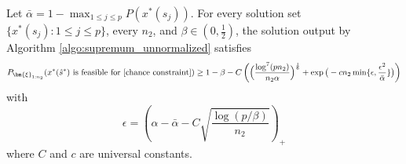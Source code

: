 \documentclass[mnsc,blindrev]{informs4} %
\newcommand{\prth}[1]{\left(#1\right)}
\begin{document}





\begin{theorem}\label{feasibility:gs unnormalized}
Let $\bar{\alpha}=1-\max_{1\leq j\leq p}P(x^*(s_j))$. For every solution set $\{x^*(s_j):1\leq j\leq p\}$, every $n_2$, and $\beta\in(0,\frac{1}{2})$, the solution output by Algorithm \ref{algo:supremum_unnormalized} satisfies
\begin{equation*}
P_{\bm{\xi}_{1:n_2}}(x^*(\hat s^*)\text{ is feasible for \eqref{chance constraint}})\geq 1-\beta-C\prth{\Big(\frac{\log^7(pn_2)}{n_2\alpha}\Big)^{\frac{1}{6}}+\exp\big(-cn_2\min\{\epsilon,\frac{\epsilon^2}{\bar{\alpha}}\}\big)}
\end{equation*}
with
\begin{equation}\label{statistical error unnormalized}
    \epsilon=\prth{\alpha-\bar{\alpha}-C\sqrt{\frac{\log( p/\beta)}{n_2}}}_+
\end{equation}
where $C$ and $c$ are universal constants.
\end{theorem}
\end{document}
